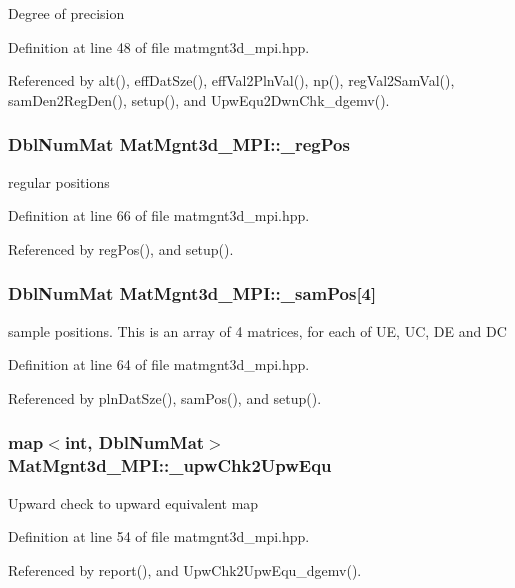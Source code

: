 Degree of precision 

Definition at line 48 of file matmgnt3d\_\-mpi.hpp.

Referenced by alt(), eff\-Dat\-Sze(), eff\-Val2Pln\-Val(), np(), reg\-Val2Sam\-Val(), sam\-Den2Reg\-Den(), setup(), and Upw\-Equ2Dwn\-Chk\_\-dgemv().
\subsubsection{\setlength{\rightskip}{0pt plus 5cm}Dbl\-Num\-Mat {\bf Mat\-Mgnt3d\_\-MPI::\_\-reg\-Pos}}\label{classMatMgnt3d__MPI_afe2677ddc7bd25cc4255c723397bdd7_afe2677ddc7bd25cc4255c723397bdd7}


regular positions 

Definition at line 66 of file matmgnt3d\_\-mpi.hpp.

Referenced by reg\-Pos(), and setup().
\subsubsection{\setlength{\rightskip}{0pt plus 5cm}Dbl\-Num\-Mat {\bf Mat\-Mgnt3d\_\-MPI::\_\-sam\-Pos}[4]}\label{classMatMgnt3d__MPI_ba2fc588d5e34912fb575182f6d110c4_ba2fc588d5e34912fb575182f6d110c4}


sample positions. This is an array of 4 matrices, for each of UE, UC, DE and DC 

Definition at line 64 of file matmgnt3d\_\-mpi.hpp.

Referenced by pln\-Dat\-Sze(), sam\-Pos(), and setup().
\subsubsection{\setlength{\rightskip}{0pt plus 5cm}map$<$int, Dbl\-Num\-Mat$>$ {\bf Mat\-Mgnt3d\_\-MPI::\_\-upw\-Chk2Upw\-Equ}}\label{classMatMgnt3d__MPI_b698e133e8b80af377013cfa83a64f9c_b698e133e8b80af377013cfa83a64f9c}


Upward check to upward equivalent map 

Definition at line 54 of file matmgnt3d\_\-mpi.hpp.

Referenced by report(), and Upw\-Chk2Upw\-Equ\_\-dgemv().
